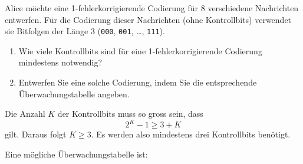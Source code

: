\begin{myexercise}
    Alice möchte eine 1-fehlerkorrigierende Codierung für
    8 verschiedene Nachrichten entwerfen. Für die Codierung
    dieser Nachrichten (ohne Kontrollbits) verwendet sie
    Bitfolgen der Länge 3
    (\texttt{000}, \texttt{001}, \ldots, \texttt{111}).

    \begin{enumerate}
        \item Wie viele Kontrollbits sind für eine
              1-fehlerkorrigierende Codierung mindestens notwendig?

        \item Entwerfen Sie eine solche Codierung, indem Sie
              die entsprechende Überwachungstabelle angeben.
    \end{enumerate}
    \begin{myanswer}

        Die Anzahl \(K\) der Kontrollbits muss so gross sein, dass
        \[
            2^K-1 \geq 3+K
        \]
        gilt. Daraus folgt \(K\geq 3\). Es werden also mindestens
        drei Kontrollbits benötigt.

        Eine mögliche Überwachungstabelle ist:

        \begin{center}
\end{center}
\end{myanswer}
\end{myexercise}
